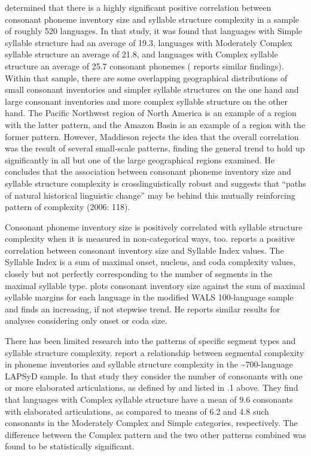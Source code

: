   \citet{Maddieson2006} determined that there is a highly significant positive correlation between consonant phoneme inventory size and syllable structure complexity in a sample of roughly 520 languages. In that study, it was found that languages with Simple syllable structure had an average of 19.3, languages with Moderately Complex syllable structure an average of 21.8, and languages with Complex syllable structure an average of 25.7 consonant phonemes (\citealt{Maddieson2013a} reports similar findings). Within that sample, there are some overlapping geographical distributions of small consonant inventories and simpler syllable structures on the one hand and large consonant inventories and more complex syllable structure on the other hand. The Pacific Northwest region of North America is an example of a region with the latter pattern, and the Amazon Basin is an example of a region with the former pattern. However, Maddieson rejects the idea that the overall correlation was the result of several small-scale patterns, finding the general trend to hold up significantly in all but one of the large geographical regions examined. He concludes that the association between consonant phoneme inventory size and syllable structure complexity is crosslinguistically robust and suggests that “paths of natural historical linguistic change” may be behind this mutually reinforcing pattern of complexity (2006: 118). 



  Consonant phoneme inventory size is positively correlated with syllable structure complexity when it is measured in non-categorical ways, too. \citet{Maddieson2011} reports a positive correlation between consonant inventory size and Syllable Index values. The Syllable Index is a sum of maximal onset, nucleus, and coda complexity values, closely but not perfectly corresponding to the number of segments in the maximal syllable type. \citet{Gordon2016} plots consonant inventory size against the sum of maximal syllable margins for each language in the modified WALS 100-language sample and finds an increasing, if not stepwise trend. He reports similar results for analyses considering only onset or coda size.



  There has been limited research into the patterns of specific segment types and syllable structure complexity. \citet{MaddiesonEtAl2013} report a relationship between segmental complexity in phoneme inventories and syllable structure complexity in the {\textasciitilde}700-language LAPSyD sample. In that study they consider the number of consonants with one or more elaborated articulations, as defined by \citet{LindblomMaddieson1988} and listed in .1 above. They find that languages with Complex syllable structure have a mean of 9.6 consonants with elaborated articulations, as compared to means of 6.2 and 4.8 such consonants in the Moderately Complex and Simple categories, respectively. The difference between the Complex pattern and the two other patterns combined was found to be statistically significant.



